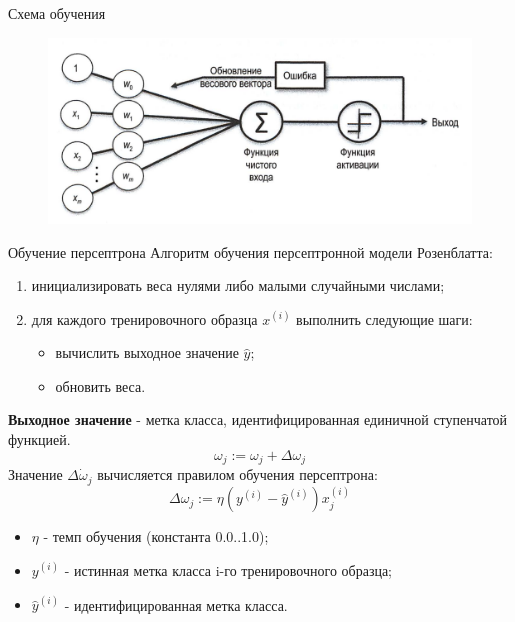 \documentclass{beamer}
\begin{document}
\begin{frame}[t]{Схема обучения}
	\begin{figure}[h]
		\centering
		\includegraphics[scale=0.4]{images/lec03-pic09.png}
	\end{figure}
\end{frame}

\begin{frame}[t]{Обучение персептрона}
	Алгоритм обучения персептронной модели Розенблатта:
	\begin{enumerate}
		\item инициализировать веса нулями либо малыми случайными числами;
		\item для каждого тренировочного образца $x^{(i)}$ выполнить следующие шаги:
		\begin{itemize}
			\item вычислить выходное значение $\hat{y}$;
			\item обновить веса.
		\end{itemize}
	\end{enumerate}
	\textbf{Выходное значение} - метка класса, идентифицированная единичной ступенчатой функцией.
	\[\omega_j := \omega_j + \Delta\omega_j\]
	Значение $\Delta\dot\omega_j$ вычисляется правилом обучения персептрона:
	\[\Delta\omega_j := \eta(y^{(i)} - \hat{y}^{(i)})x^{(i)}_j \]
	\begin{itemize}
		\item $\eta$ - темп обучения (константа 0.0..1.0);
		\item $y^{(i)}$ - истинная метка класса i-го тренировочного образца;
		\item $\hat{y}^{(i)}$ - идентифицированная метка класса. 
	\end{itemize}
\end{frame}
\end{document}
